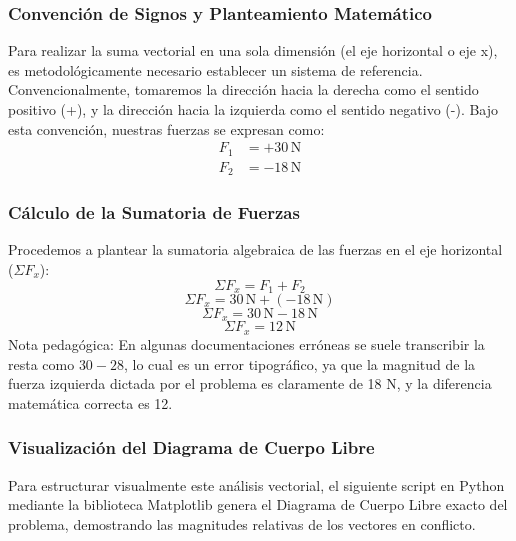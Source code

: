 \documentclass[12pt]{article}
\begin{document}
\subsubsection*{Convención de Signos y Planteamiento Matemático}
Para realizar la suma vectorial en una sola dimensión (el eje horizontal o eje x), es metodológicamente necesario establecer un sistema de referencia. Convencionalmente, tomaremos la dirección hacia la derecha como el sentido positivo (+), y la dirección hacia la izquierda como el sentido negativo (-). 
Bajo esta convención, nuestras fuerzas se expresan como:
\begin{align*}
    F_1 &= +30 \, \text{N} \\
    F_2 &= -18 \, \text{N}
\end{align*}

\subsubsection*{Cálculo de la Sumatoria de Fuerzas}
Procedemos a plantear la sumatoria algebraica de las fuerzas en el eje horizontal ($\Sigma F_x$):
\begin{equation}
    \Sigma F_x = F_1 + F_2
\end{equation}
\begin{equation}
    \Sigma F_x = 30 \, \text{N} + (-18 \, \text{N})
\end{equation}
\begin{equation}
    \Sigma F_x = 30 \, \text{N} - 18 \, \text{N}
\end{equation}
\begin{equation}
    \Sigma F_x = 12 \, \text{N}
\end{equation}
Nota pedagógica: En algunas documentaciones erróneas se suele transcribir la resta como $30 - 28$, lo cual es un error tipográfico, ya que la magnitud de la fuerza izquierda dictada por el problema es claramente de 18 N, y la diferencia matemática correcta es 12.

\subsubsection*{Visualización del Diagrama de Cuerpo Libre}
Para estructurar visualmente este análisis vectorial, el siguiente script en Python mediante la biblioteca Matplotlib genera el Diagrama de Cuerpo Libre exacto del problema, demostrando las magnitudes relativas de los vectores en conflicto.
\end{document}
